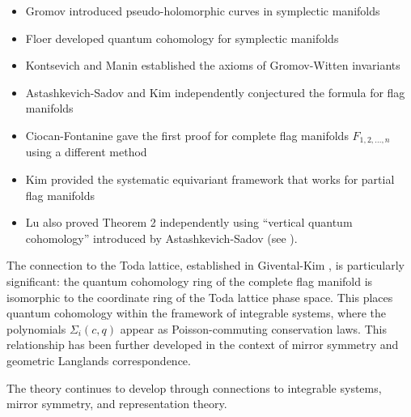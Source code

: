 \begin{itemize}
\item Gromov \cite{Gromov1985} introduced pseudo-holomorphic curves in symplectic manifolds
\item Floer \cite{Floer1986} developed quantum cohomology for symplectic manifolds
\item Kontsevich and Manin \cite{KontsevichManin1994} established the axioms of Gromov-Witten invariants
\item Astashkevich-Sadov \cite{AstashkevichSadov1995} and Kim \cite{Kim1995} independently conjectured the formula for flag manifolds
\item Ciocan-Fontanine gave the first proof for complete flag manifolds $F_{1,2,\ldots,n}$ using a different method
\item Kim \cite{Kim1996} provided the systematic equivariant framework that works for partial flag manifolds
\item Lu also proved Theorem 2 independently using ``vertical quantum cohomology'' introduced by Astashkevich-Sadov \cite{AstashkevichSadov1995} (see \cite[Remark 2]{Kim1996}).
\end{itemize}

The connection to the Toda lattice, established in Givental-Kim \cite{GiventalKim1995}, is particularly significant: the quantum cohomology ring of the complete flag manifold is isomorphic to the coordinate ring of the Toda lattice phase space. This places quantum cohomology within the framework of integrable systems, where the polynomials $\Sigma_i(c,q)$ appear as Poisson-commuting conservation laws. This relationship has been further developed in the context of mirror symmetry and geometric Langlands correspondence.

The theory continues to develop through connections to integrable systems, mirror symmetry, and representation theory.

